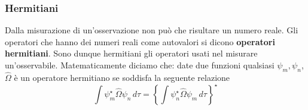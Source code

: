 \subsubsection{Hermitiani}
Dalla misurazione di un'osservazione non può che risultare un numero reale. Gli operatori che hanno dei numeri reali come autovalori si dicono \textbf{operatori hermitiani}. Sono dunque hermitiani gli operatori usati nel misurare un'osservabile. Matematicamente diciamo che: date due funzioni qualsiasi $\psi_m, \psi_n$, $\hat{\Omega}$ è un operatore hermitiano se soddisfa la seguente relazione
$$\int \psi_m^{\star} \hat{\Omega} \psi_n\, d\tau = \left \{ \int \psi_n^{\star} \hat{\Omega} \psi_m\, d\tau \right \}^{\star}$$
